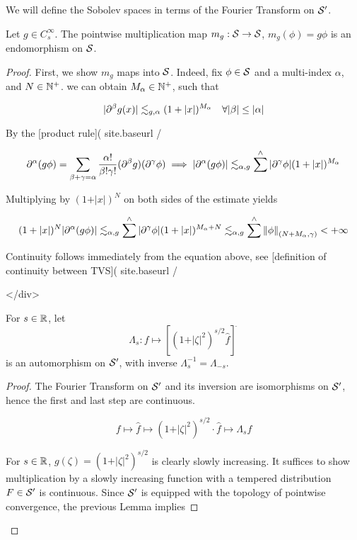 \documentclass[../main-manifolds.tex]{subfiles}
\begin{document}
{{We will define the Sobolev spaces in terms of the Fourier Transform on $\mathcal{S}'$. 


\begin{lemma}
Let $g\in C_s^\infty$. The pointwise multiplication map $m_g: \mathcal{S}\to\mathcal{S}$, $m_g(\phi) = g\phi$ is an endomorphism on $\mathcal{S}$.
\end{lemma}
\begin{proof}
First, we show $m_g$ maps into $\mathcal{S}$. Indeed, fix $\phi\in\mathcal{S}$ and a multi-index $\alpha$, and $N\in\mathbb{N}^+$. we can obtain $M_\alpha\in\mathbb{N}^+$, such that

$$
\vert \partial^\beta g(x)\vert\lesssim_{g,\alpha} (1+\vert x\vert)^{M_\alpha}\quad\forall\vert\beta\vert\leq\vert\alpha\vert
$$

By the [product rule]({{ site.baseurl }}/{%

$$
\partial^\alpha (g\phi) = \sum_{\beta+\gamma = \alpha}\dfrac{\alpha!}{\beta!\gamma!}(\partial^\beta g)(\partial^\gamma \phi)\implies\vert\partial^\alpha(g\phi)\vert\lesssim_{\alpha,g}\sum^{\wedge}\vert\partial^\gamma\phi\vert(1+\vert x\vert)^{M_{\alpha}}
$$

Multiplying by $(1+\vert x\vert)^{N}$ on both sides of the estimate yields

$$
(1+\vert x\vert)^N\vert\partial^\alpha(g\phi)\vert\lesssim_{\alpha,g}\sum^{\wedge}\vert\partial^\gamma\phi\vert(1+\vert x\vert)^{M_\alpha + N}\lesssim_{\alpha,g}\sum^{\wedge}\norm{\phi}_{(N+M_\alpha,\gamma)}<+\infty
$$

Continuity follows immediately from the equation above, see [definition of continuity between TVS]({{ site.baseurl }}/{%


</div>
\begin{lemma}
For $s\in\mathbb{R}$, let $$\Lambda_s: f\mapsto [(1+\vert\zeta\vert^2)^{s/2}\hat{f}]^{\breve{\:}}$$ is an automorphism on $\mathcal{S}'$, with inverse $\Lambda_s^{-1} = \Lambda_{-s}$.
\end{lemma}
\begin{proof}
The Fourier Transform on $\mathcal{S}'$ and its inversion are isomorphisms on $\mathcal{S}'$, hence the first and last step are continuous. 

$$
f\mapsto \hat{f}\mapsto (1+\vert\zeta\vert^2)^{s/2}\cdot \hat{f} \mapsto \Lambda_s f
$$


For $s\in\mathbb{R}$, $g(\zeta) = (1+\vert\zeta\vert^2)^{s/2}$ is clearly slowly increasing. It suffices to show multiplication by a slowly increasing function with a tempered distribution $F\in \mathcal{S}'$ is continuous. Since $\mathcal{S}'$ is equipped with the topology of pointwise convergence, the previous Lemma implies 


\end{proof}}}
\end{proof}}}
\end{document}
